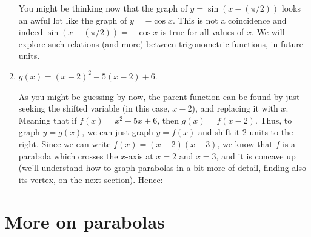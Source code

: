 \documentclass{ximera}
\begin{document}
\begin{example}
\begin{enumerate}[label=\alph*.]
\begin{explanation}
\begin{image}
      \end{image}
      You might be thinking now that the graph of $y = \sin(x-(\pi/2))$ looks an awful lot like the graph of $y = -\cos x$. This is not a coincidence and indeed $\sin(x-(\pi/2)) = -\cos x$ is true for all values of $x$. We will explore such relations (and more) between trigonometric functions, in future units.
    \end{explanation}
  \item $g(x) = (x-2)^2 - 5(x-2)+6$. \\[.5em]
    \begin{explanation}
      As you might be guessing by now, the parent function can be found by just seeking the shifted variable (in this case, $x-2$), and replacing it with $x$. Meaning that if $f(x) = x^2-5x+6$, then $g(x) =f(x-2)$. Thus, to graph $y=g(x)$, we can just graph $y=f(x)$ and shift it $2$ units to the right. Since we can write $f(x) = (x-2)(x-3)$, we know that $f$ is a parabola which crosses the $x$-axis at $x=2$ and $x=3$, and it is concave up (we'll understand how to graph parabolas in a bit more of detail, finding also its vertex, on the next section). Hence:
      \begin{image}
      \end{image}
    \end{explanation}
  \end{enumerate}
\end{example}

\section{More on parabolas}
\end{document}
